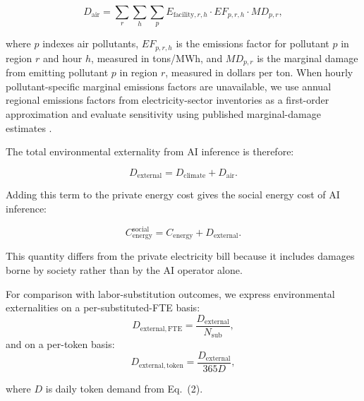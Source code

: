 \documentclass{article}
\begin{document}
\begin{equation}
D_{\mathrm{air}}
=
\sum_{r}\sum_{h}\sum_{p}
E_{\mathrm{facility},r,h}
\cdot
EF_{p,r,h}
\cdot
MD_{p,r},
\end{equation}

where $p$ indexes air pollutants, $EF_{p,r,h}$ is the emissions factor for pollutant $p$ in region $r$ and hour $h$, measured in tons/MWh, and $MD_{p,r}$ is the marginal damage from emitting pollutant $p$ in region $r$, measured in dollars per ton. When hourly pollutant-specific marginal emissions factors are unavailable, we use annual regional emissions factors from electricity-sector inventories as a first-order approximation and evaluate sensitivity using published marginal-damage estimates \citep{muller2011_air_pollution, jaramillo2016_energy,
goodkind_2019_fine_scale, tessum_2017_inmap}.

The total environmental externality from AI inference is therefore:

\begin{equation}
D_{\mathrm{external}}
=
D_{\mathrm{climate}}
+
D_{\mathrm{air}}.
\end{equation}

Adding this term to the private energy cost gives the social energy cost of AI inference:

\begin{equation}
C_{\mathrm{energy}}^{\mathrm{social}}
=
C_{\mathrm{energy}}
+
D_{\mathrm{external}}.
\end{equation}

This quantity differs from the private electricity bill because it includes damages borne by society rather than by the AI operator alone.

For comparison with labor-substitution outcomes, we express environmental externalities on a per-substituted-FTE basis:
\begin{equation}
D_{\mathrm{external,FTE}}
=
\frac{D_{\mathrm{external}}}{N_{\mathrm{sub}}},
\end{equation}
and on a per-token basis:
\begin{equation}
D_{\mathrm{external,token}}
=
\frac{D_{\mathrm{external}}}{365D},
\end{equation}

where $D$ is daily token demand from Eq.~(2). 

\end{document}
